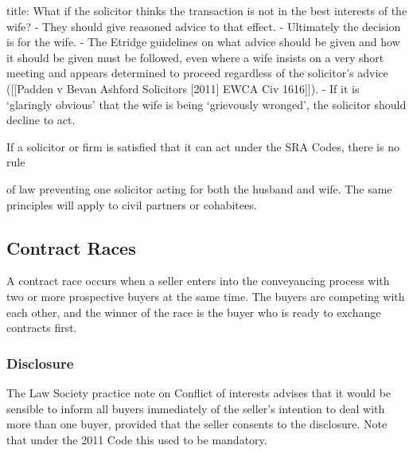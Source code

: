 \documentclass[
]{article}
\newenvironment{Shaded}{}{}
\newcommand{\NormalTok}[1]{#1}
\begin{document}
\begin{Shaded}
\begin{Highlighting}[]
\NormalTok{title: What if the solicitor thinks the transaction is not in the best interests of the wife?}
\NormalTok{{-} They should give reasoned advice to that effect.}
\NormalTok{{-} Ultimately the decision is for the wife. }
\NormalTok{{-} The Etridge guidelines on what advice should be given and how it should be given must be followed, even where a wife insists on a very short meeting and appears determined to proceed regardless of the solicitor’s advice ([[Padden v Bevan Ashford Solicitors [2011] EWCA Civ 1616]]). }
\NormalTok{{-} If it is ‘glaringly obvious’ that the wife is being ‘grievously wronged’, the solicitor should decline to act.}
\end{Highlighting}
\end{Shaded}

If a solicitor or firm is satisfied that it can act under the SRA Codes,
there is no rule

of law preventing one solicitor acting for both the husband and wife.
The same principles will apply to civil partners or cohabitees.

\hypertarget{contract-races}{%
\subsection{Contract Races}\label{contract-races}}

\begin{Shaded}
\begin{Highlighting}[]
\NormalTok{A contract race occurs when a seller enters into the conveyancing process with two or more prospective buyers at the same time. The buyers are competing with each other, and the winner of the race is the buyer who is ready to exchange contracts first.}
\end{Highlighting}
\end{Shaded}

\hypertarget{disclosure}{%
\subsubsection{Disclosure}\label{disclosure}}

The Law Society practice note on Conflict of interests advises that it
would be sensible to inform all buyers immediately of the seller's
intention to deal with more than one buyer, provided that the seller
consents to the disclosure. Note that under the 2011 Code this used to
be mandatory.
\end{document}
